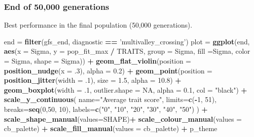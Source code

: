 \documentclass[]{book}
\newenvironment{Shaded}{\begin{snugshade}}{\end{snugshade}}
\newcommand{\DataTypeTok}[1]{\textcolor[rgb]{0.13,0.29,0.53}{#1}}
\newcommand{\DecValTok}[1]{\textcolor[rgb]{0.00,0.00,0.81}{#1}}
\newcommand{\FloatTok}[1]{\textcolor[rgb]{0.00,0.00,0.81}{#1}}
\newcommand{\KeywordTok}[1]{\textcolor[rgb]{0.13,0.29,0.53}{\textbf{#1}}}
\newcommand{\NormalTok}[1]{#1}
\newcommand{\OperatorTok}[1]{\textcolor[rgb]{0.81,0.36,0.00}{\textbf{#1}}}
\newcommand{\OtherTok}[1]{\textcolor[rgb]{0.56,0.35,0.01}{#1}}
\newcommand{\StringTok}[1]{\textcolor[rgb]{0.31,0.60,0.02}{#1}}
\begin{document}
\hypertarget{end-of-50000-generations-24}{%
\subsubsection{End of 50,000 generations}\label{end-of-50000-generations-24}}

Best performance in the final population (50,000 generations).

\begin{Shaded}
\begin{Highlighting}[]
\NormalTok{end =}\StringTok{ }\KeywordTok{filter}\NormalTok{(gfs_end, diagnostic }\OperatorTok{==}\StringTok{ 'multivalley_crossing'}\NormalTok{)}
\NormalTok{plot =}\StringTok{ }\KeywordTok{ggplot}\NormalTok{(end, }\KeywordTok{aes}\NormalTok{(}\DataTypeTok{x =}\NormalTok{ Sigma, }\DataTypeTok{y =}\NormalTok{ pop_fit_max }\OperatorTok{/}\StringTok{ }\NormalTok{TRAITS, }\DataTypeTok{group =}\NormalTok{ Sigma, }\DataTypeTok{fill =}\NormalTok{Sigma, }\DataTypeTok{color =}\NormalTok{ Sigma, }\DataTypeTok{shape =}\NormalTok{ Sigma)) }\OperatorTok{+}
\StringTok{  }\KeywordTok{geom_flat_violin}\NormalTok{(}\DataTypeTok{position =} \KeywordTok{position_nudge}\NormalTok{(}\DataTypeTok{x =} \FloatTok{.3}\NormalTok{), }\DataTypeTok{alpha =} \FloatTok{0.2}\NormalTok{) }\OperatorTok{+}
\StringTok{  }\KeywordTok{geom_point}\NormalTok{(}\DataTypeTok{position =} \KeywordTok{position_jitter}\NormalTok{(}\DataTypeTok{width =} \FloatTok{.1}\NormalTok{), }\DataTypeTok{size =} \FloatTok{1.5}\NormalTok{, }\DataTypeTok{alpha =} \FloatTok{10.8}\NormalTok{) }\OperatorTok{+}
\StringTok{  }\KeywordTok{geom_boxplot}\NormalTok{(}\DataTypeTok{width =} \FloatTok{.1}\NormalTok{, }\DataTypeTok{outlier.shape =} \OtherTok{NA}\NormalTok{, }\DataTypeTok{alpha =} \FloatTok{0.1}\NormalTok{, }\DataTypeTok{col =} \StringTok{"black"}\NormalTok{) }\OperatorTok{+}
\StringTok{  }\KeywordTok{scale_y_continuous}\NormalTok{(}
    \DataTypeTok{name=}\StringTok{"Average trait score"}\NormalTok{,}
    \DataTypeTok{limits=}\KeywordTok{c}\NormalTok{(}\OperatorTok{-}\DecValTok{1}\NormalTok{, }\DecValTok{51}\NormalTok{),}
    \DataTypeTok{breaks=}\KeywordTok{seq}\NormalTok{(}\DecValTok{0}\NormalTok{,}\DecValTok{50}\NormalTok{, }\DecValTok{10}\NormalTok{),}
    \DataTypeTok{labels=}\KeywordTok{c}\NormalTok{(}\StringTok{"0"}\NormalTok{, }\StringTok{"10"}\NormalTok{, }\StringTok{"20"}\NormalTok{, }\StringTok{"30"}\NormalTok{, }\StringTok{"40"}\NormalTok{, }\StringTok{"50"}\NormalTok{)}
\NormalTok{  ) }\OperatorTok{+}
\StringTok{  }\KeywordTok{scale_shape_manual}\NormalTok{(}\DataTypeTok{values=}\NormalTok{SHAPE)}\OperatorTok{+}
\StringTok{  }\KeywordTok{scale_colour_manual}\NormalTok{(}\DataTypeTok{values =}\NormalTok{ cb_palette) }\OperatorTok{+}
\StringTok{  }\KeywordTok{scale_fill_manual}\NormalTok{(}\DataTypeTok{values =}\NormalTok{ cb_palette) }\OperatorTok{+}
\StringTok{  }\NormalTok{p_theme}


\end{Highlighting}
\end{Shaded}
\end{document}
